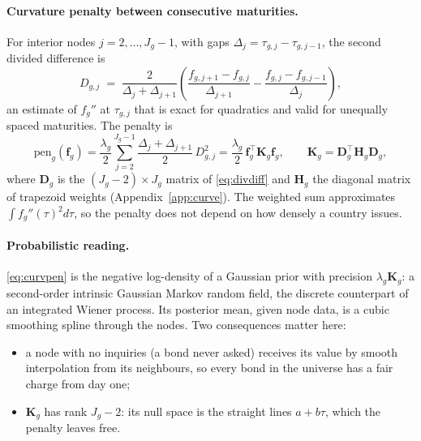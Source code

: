 \documentclass[11pt,a4paper]{article}
\theoremstyle{definition}
\theoremstyle{remark}
\newcommand{\T}{^{\top}}
\newcommand{\bff}{\bm{f}}
\begin{document}
\paragraph{Curvature penalty between consecutive maturities.} For interior nodes $j=2,\dots,J_g-1$, with gaps $\Delta_j=\tau_{g,j}-\tau_{g,j-1}$, the second divided difference is
\begin{equation}\label{eq:divdiff}
D_{g,j}\;=\;\frac{2}{\Delta_j+\Delta_{j+1}}\left(\frac{f_{g,j+1}-f_{g,j}}{\Delta_{j+1}}-\frac{f_{g,j}-f_{g,j-1}}{\Delta_j}\right),
\end{equation}
an estimate of $f_g''$ at $\tau_{g,j}$ that is exact for quadratics and valid for unequally spaced maturities. The penalty is
\begin{equation}\label{eq:curvpen}
\mathrm{pen}_g(\bff_g)=\frac{\lambda_g}{2}\sum_{j=2}^{J_g-1}\frac{\Delta_j+\Delta_{j+1}}{2}\,D_{g,j}^2=\frac{\lambda_g}{2}\,\bff_g\T\bm K_g\bff_g,\qquad \bm K_g=\bm D_g\T\bm H_g\bm D_g,
\end{equation}
where $\bm D_g$ is the $(J_g-2)\times J_g$ matrix of \eqref{eq:divdiff} and $\bm H_g$ the diagonal matrix of trapezoid weights (Appendix~\ref{app:curve}). The weighted sum approximates $\int f_g''(\tau)^2d\tau$, so the penalty does not depend on how densely a country issues.

\paragraph{Probabilistic reading.} \eqref{eq:curvpen} is the negative log-density of a Gaussian prior with precision $\lambda_g\bm K_g$: a second-order intrinsic Gaussian Markov random field, the discrete counterpart of an integrated Wiener process. Its posterior mean, given node data, is a cubic smoothing spline through the nodes. Two consequences matter here:
\begin{itemize}[itemsep=1pt]
\item a node with no inquiries (a bond never asked) receives its value by smooth interpolation from its neighbours, so every bond in the universe has a fair charge from day one;
\item $\bm K_g$ has rank $J_g-2$: its null space is the straight lines $a+b\tau$, which the penalty leaves free.
\end{itemize}
\end{document}
